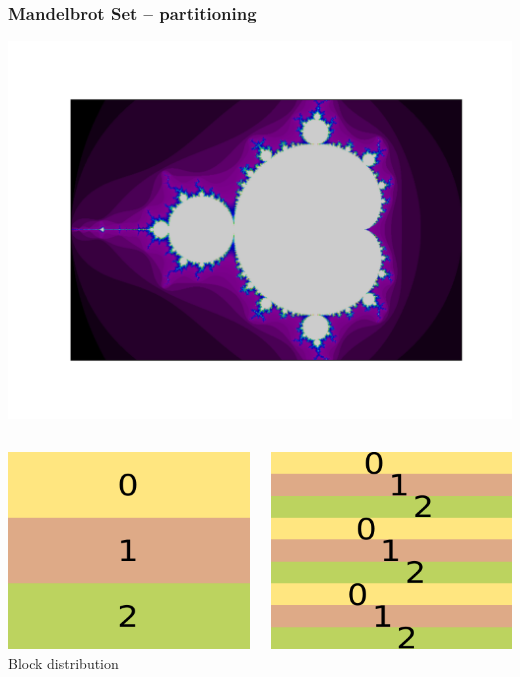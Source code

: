 \begin{frame}
  \frametitle{Mandelbrot Set -- partitioning}
  \begin{minipage}{\textwidth}
    \centering
    \includegraphics[scale=0.25]{mandelbrot.pdf}
  \end{minipage}
  \begin{columns}[t]
    \begin{column}{0.45\textwidth}
      \centering
      \includegraphics[scale=0.5]{dist-block.pdf}\\
      Block distribution
    \end{column}
    \begin{column}{0.45\textwidth}
      \centering
      \includegraphics[scale=0.5]{dist-cyclic.pdf}\\

\end{column}
\end{columns}
\end{frame}
